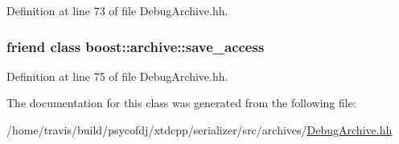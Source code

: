 Definition at line 73 of file Debug\-Archive.\-hh.

\hypertarget{classxtd_1_1serializer_1_1DebugXmlIArchive_aaca003bb8a4fc59424e4025130da4edd}{
\subsubsection[{boost\-::archive\-::save\-\_\-access}]{\setlength{\rightskip}{0pt plus 5cm}friend class boost\-::archive\-::save\-\_\-access\hspace{0.3cm}{\ttfamily [friend]}}}\label{classxtd_1_1serializer_1_1DebugXmlIArchive_aaca003bb8a4fc59424e4025130da4edd}


Definition at line 75 of file Debug\-Archive.\-hh.



The documentation for this class was generated from the following file\-:\begin{DoxyCompactItemize}
\item 
/home/travis/build/psycofdj/xtdcpp/serializer/src/archives/\hyperlink{DebugArchive_8hh}{Debug\-Archive.\-hh}\end{DoxyCompactItemize}
